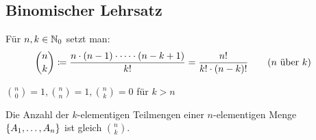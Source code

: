\subsection{Binomischer Lehrsatz}
\begin{definition}[Binomialkoeffizient]
    Für $n,k\in\mathbb{N}_0$ setzt man:
    \begin{align*}
        \binom{n}{k} &\coloneqq \frac{n\cdot(n-1)\cdot\dots\cdot(n-k+1)}{k!} = \frac{n!}{k!\cdot(n-k)!} \tag{$n$ über $k$}
    \end{align*}
\end{definition}
\begin{bemerkung}
    $\binom{n}{0} = 1, \binom{n}{n} = 1, \binom{n}{k} = 0$ für $k>n$
\end{bemerkung}

\begin{satz}
    \label{satz:teilmengen-anzahl}
    Die Anzahl der $k$-elementigen Teilmengen einer $n$-elementigen Menge $\left\{A_1, \dots, A_n\right\}$ ist gleich $\binom{n}{k}$.
\end{satz}

